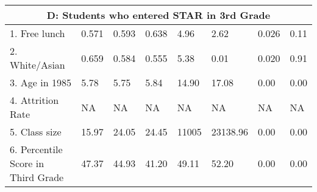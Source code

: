 \begin{tabular}[H]{ |p{4cm}p{1cm}p{1cm}p{1cm}p{1cm}p{1cm}p{1cm}p{1cm}|}
\multicolumn{8}{|c|}{D:  Students who entered STAR in 3rd Grade}\\
\hline
1. Free lunch &0.571 & 0.593 & 0.638 &4.96&2.62&0.026&0.11\\
2. White/Asian & 0.659 & 0.584 & 0.555 &5.38&0.01&0.020&0.91\\
3. Age in 1985 & 5.78 & 5.75 & 5.84 &14.90&17.08&0.00&0.00\\
4. Attrition Rate & NA & NA & NA &NA&NA&NA&NA\\
5. Class size & 15.97 & 24.05 & 24.45 &11005&23138.96&0.00&0.00\\
6. Percentile Score in Third Grade & 47.37 & 44.93 & 41.20 &49.11&52.20&0.00&0.00\\


\hline
\hline

\end{tabular}

